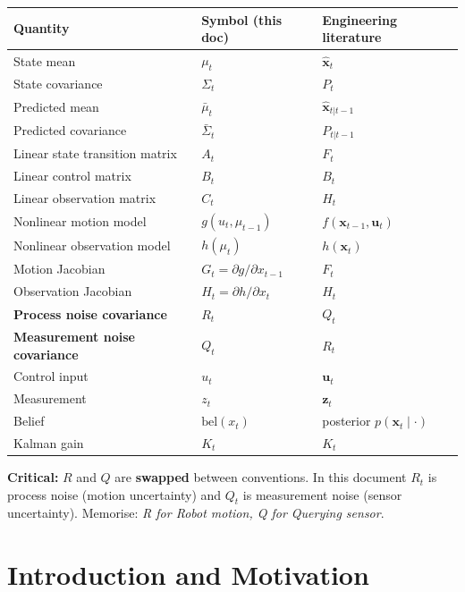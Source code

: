 \documentclass[11pt,a4paper]{article}
\begin{document}
\begin{center}
\begin{tabular}{lll}
\toprule
\textbf{Quantity} & \textbf{Symbol (this doc)} & \textbf{Engineering literature} \\
\midrule
State mean & $\mu_t$ & $\hat{\mathbf{x}}_t$ \\
State covariance & $\Sigma_t$ & $P_t$ \\
Predicted mean & $\bar{\mu}_t$ & $\hat{\mathbf{x}}_{t|t-1}$ \\
Predicted covariance & $\bar{\Sigma}_t$ & $P_{t|t-1}$ \\
Linear state transition matrix & $A_t$ & $F_t$ \\
Linear control matrix & $B_t$ & $B_t$ \\
Linear observation matrix & $C_t$ & $H_t$ \\
Nonlinear motion model & $g(u_t, \mu_{t-1})$ & $f(\mathbf{x}_{t-1}, \mathbf{u}_t)$ \\
Nonlinear observation model & $h(\mu_t)$ & $h(\mathbf{x}_t)$ \\
Motion Jacobian & $G_t = \partial g / \partial x_{t-1}$ & $F_t$ \\
Observation Jacobian & $H_t = \partial h / \partial x_t$ & $H_t$ \\
\textbf{Process noise covariance} & $\boxed{R_t}$ & $Q_t$ \\
\textbf{Measurement noise covariance} & $\boxed{Q_t}$ & $R_t$ \\
Control input & $u_t$ & $\mathbf{u}_t$ \\
Measurement & $z_t$ & $\mathbf{z}_t$ \\
Belief & $\mathrm{bel}(x_t)$ & posterior $p(\mathbf{x}_t \mid \cdot)$ \\
Kalman gain & $K_t$ & $K_t$ \\
\bottomrule
\end{tabular}
\end{center}

\textbf{Critical:} $R$ and $Q$ are \textbf{swapped} between conventions. In this document $R_t$ is process noise (motion uncertainty) and $Q_t$ is measurement noise (sensor uncertainty). Memorise: \emph{R for Robot motion, Q for Querying sensor}.

\section{Introduction and Motivation}
\end{document}
